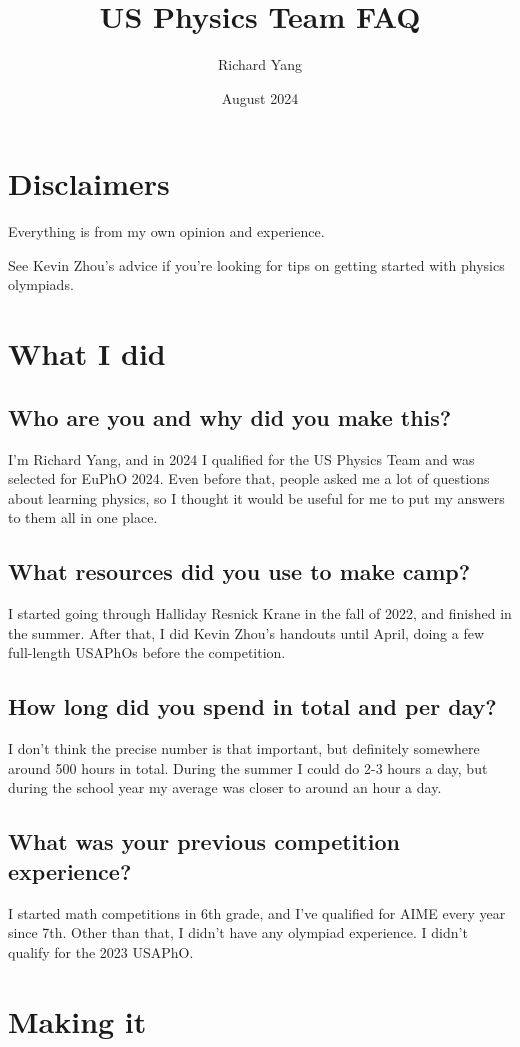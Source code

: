 \documentclass[11pt]{article}
\begin{document}
\title{US Physics Team FAQ}
\author{Richard Yang}
\date{August 2024}
\maketitle
\section*{Disclaimers} 
Everything is from my own opinion and experience. 

\noindent See Kevin Zhou’s advice if you’re looking for tips on getting started with physics olympiads. 
\section*{What I did}
\subsection*{Who are you and why did you make this?}
I’m Richard Yang, and in 2024 I qualified for the US Physics Team and was selected for EuPhO 2024. Even before that, people asked me a lot of questions about learning physics, so I thought it would be useful for me to put my answers to them all in one place.
\subsection*{What resources did you use to make camp?}
I started going through Halliday Resnick Krane in the fall of 2022, and finished in the summer. After that, I did Kevin Zhou’s handouts until April, doing a few full-length USAPhOs before the competition.
\subsection*{How long did you spend in total and per day?}
I don’t think the precise number is that important, but definitely somewhere around 500 hours in total. During the summer I could do 2-3 hours a day, but during the school year my average was closer to around an hour a day.
\subsection*{What was your previous competition experience?}
I started math competitions in 6th grade, and I’ve qualified for AIME every year since 7th. Other than that, I didn’t have any olympiad experience. I didn’t qualify for the 2023 USAPhO.
\section*{Making it}
\end{document}
